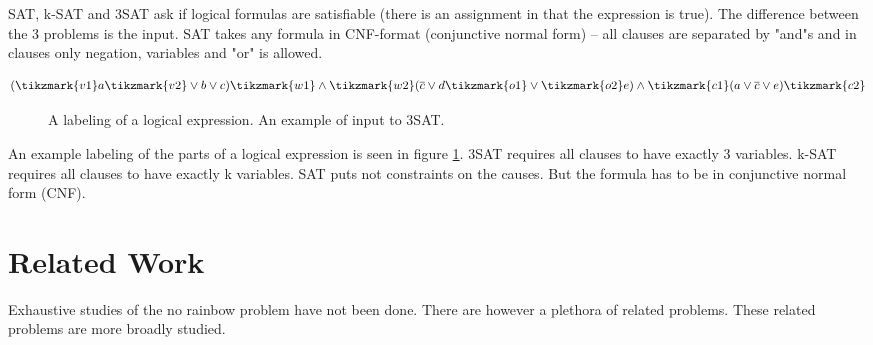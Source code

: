 \documentclass[msc,lith,english]{liuthesis}
\begin{document}
SAT, k-SAT and 3SAT ask if logical formulas are satisfiable (there is an assignment in that the expression is true).
The difference between the 3 problems is the input. SAT takes any formula in
CNF-format (conjunctive normal form) -- all clauses are separated by "and"s and
in clauses only negation, variables and "or" is allowed.

$$
  (\tikzmark{v1}a\tikzmark{v2} \vee b \vee c) \tikzmark{w1}\wedge\tikzmark{w2} (\overline{c} \vee d \tikzmark{o1}\vee\tikzmark{o2} e) \wedge \tikzmark{c1}(a \vee \overline{c} \vee e)\tikzmark{c2}
$$
\begin{figure}[h]
  \caption{A labeling of a logical expression. An example of input to 3SAT.}
  \label{figExSAT}
\end{figure}


An example labeling of the  parts of a logical expression is seen in figure
\ref{figExSAT}. 3SAT requires all clauses to have exactly 3 variables. k-SAT requires all clauses to have exactly k variables. SAT puts not constraints on the causes. But the formula has to be in conjunctive normal form (CNF).




\chapter{Related Work}
Exhaustive studies of the no rainbow problem have not been done. There are however a plethora of related problems.
These related problems are more broadly studied.
\end{document}
